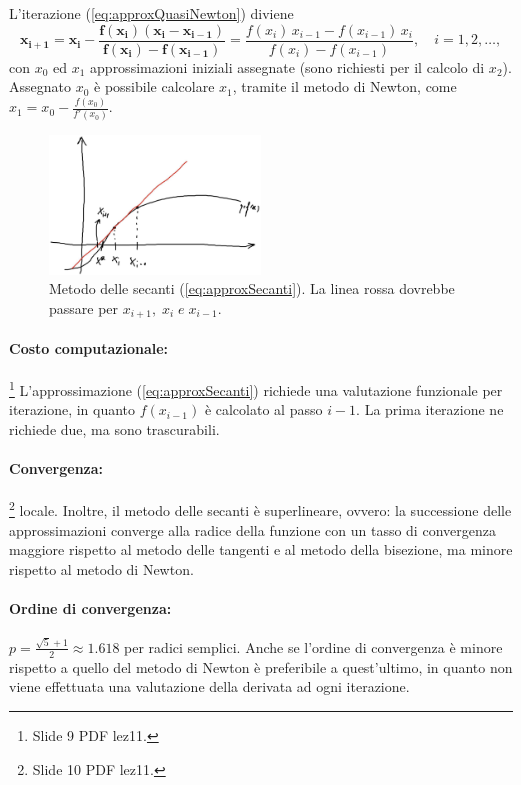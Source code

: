 L'iterazione (\ref{eq:approxQuasiNewton}) diviene
\begin{equation}\label{eq:approxSecanti}
	\boldsymbol{x_{i+1}=x_i-\frac{f(x_i)(x_i-x_{i-1})}{f(x_i)-f(x_{i-1})}}=\frac{f(x_i)\,x_{i-1} - f(x_{i-1})\,x_i}{f(x_i)-f(x_{i-1})}, \quad i=1,2,\hdots,
\end{equation}
con $x_0$ ed $x_1$ approssimazioni iniziali assegnate (sono richiesti per il calcolo di $x_2$). Assegnato $x_0$ è possibile calcolare $x_1$, tramite il metodo di Newton, come $x_1=x_0-\frac{f(x_0)}{f'(x_0)}$.

\begin{figure}
	\centering
	\includegraphics[width=0.5\textwidth]{immagini/GraficoSecanti.png}
	\caption{\label{fig:GraficoSecanti} Metodo delle secanti (\ref{eq:approxSecanti}). La linea rossa dovrebbe passare per $x_{i+1},\; x_i\; e\; x_{i-1}$.}
\end{figure}

\paragraph{Costo computazionale:}\footnote{Slide 9 PDF lez11.}
L'approssimazione (\ref{eq:approxSecanti}) richiede una valutazione funzionale per iterazione, in quanto $f(x_{i-1})$ è calcolato al passo $i-1$. La prima iterazione ne richiede due, ma sono trascurabili.

\paragraph{Convergenza:}\footnote{Slide 10 PDF lez11.} locale. Inoltre, il metodo delle secanti è superlineare, ovvero: la successione delle approssimazioni converge alla radice della funzione con un tasso di convergenza maggiore rispetto al metodo delle tangenti e al metodo della bisezione, ma minore rispetto al metodo di Newton.

\paragraph{Ordine di convergenza:} $p = \frac{\sqrt{5}+1}{2}\approx 1.618$ per radici semplici. Anche se l'ordine di convergenza è minore rispetto a quello del metodo di Newton è preferibile a quest'ultimo, in quanto non viene effettuata una valutazione della derivata ad ogni iterazione.

